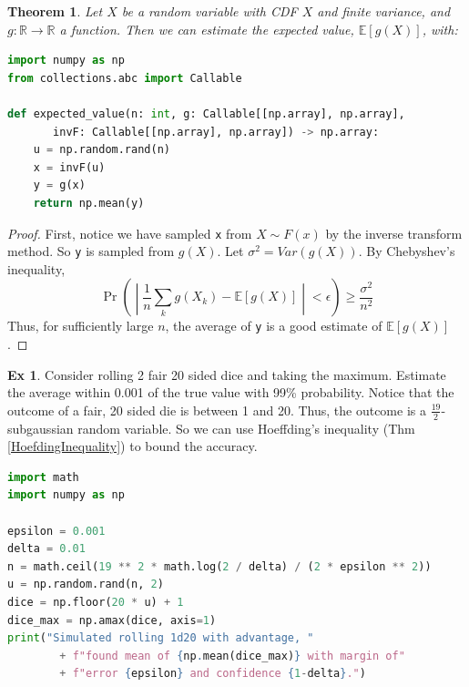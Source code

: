 \documentclass{article}
\newtheorem{theorem}{Theorem}
\theoremstyle{definition}\newtheorem{definition}{DEF}
\theoremstyle{definition}\newtheorem{example}{Ex}
\theoremstyle{lemma}\newtheorem{lemma}{Lemma}
\theoremstyle{corrolary}\newtheorem{corrolary}{Cor}
\begin{document}
\begin{theorem}
Let $X$ be a random variable with CDF $X$ and finite variance, and $g: \mathbb{R}\rightarrow \mathbb{R}$ a function.
Then we can estimate the expected value, $\mathbb{E}[g(X)]$, with:
\end{theorem}
\begin{lstlisting}[language=Python]
import numpy as np
from collections.abc import Callable

def expected_value(n: int, g: Callable[[np.array], np.array],
       invF: Callable[[np.array], np.array]) -> np.array:
    u = np.random.rand(n)
    x = invF(u)
    y = g(x)
    return np.mean(y)
\end{lstlisting}
\begin{proof}
First, notice we have sampled \verb|x| from $X\sim F(x)$ by the inverse transform method.
So \verb|y| is sampled from $g(X)$.
Let $\sigma^2=Var(g(X))$.
By Chebyshev's inequality,
$$\Pr\left( \middle| \frac{1}{n}\sum_k g(X_k) - \mathbb{E}[g(X)]\middle| < \epsilon \right) \geq \frac{\sigma^2}{n^2}$$
Thus, for sufficiently large $n$, the average of \verb|y| is a good estimate of $\mathbb{E}[g(X)]$.
\end{proof}

\begin{example}
Consider rolling 2 fair 20 sided dice and taking the maximum.
Estimate the average within 0.001 of the true value with 99\% probability.
Notice that the outcome of a fair, 20 sided die is between 1 and 20.
Thus, the outcome is a $\frac{19}{2}$-subgaussian random variable.
So we can use Hoeffding's inequality (Thm \ref{HoefdingInequality}) to bound the accuracy.
\begin{lstlisting}[language=Python]
import math
import numpy as np

epsilon = 0.001
delta = 0.01
n = math.ceil(19 ** 2 * math.log(2 / delta) / (2 * epsilon ** 2))
u = np.random.rand(n, 2)
dice = np.floor(20 * u) + 1
dice_max = np.amax(dice, axis=1)
print("Simulated rolling 1d20 with advantage, "
        + f"found mean of {np.mean(dice_max)} with margin of"
        + f"error {epsilon} and confidence {1-delta}.")
\end{lstlisting}
\end{example}
\end{document}
